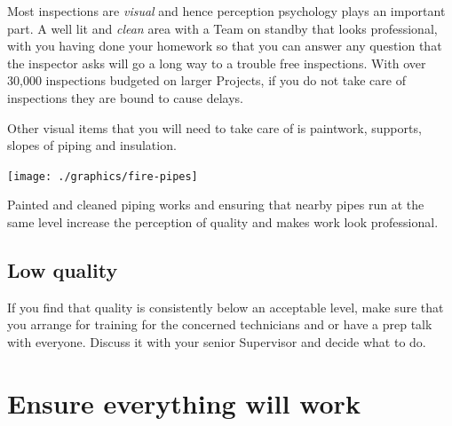 Most inspections are \textit{visual} and hence perception psychology plays
an important part. A well lit and \textit{clean} area  with a Team on standby that looks professional, with you having done your homework so that you can answer any question that the
inspector asks will go a long way to a trouble free inspections. With over
30,000 inspections budgeted on larger Projects, if you do not take care of
inspections they are bound to cause delays. 

Other visual items that you will need to take care of is paintwork, supports,
slopes of piping and insulation. 

\begin{marginfigure}
\texttt{[image: ./graphics/fire-pipes]}
\caption{Painted and cleaned piping works and ensuring that nearby pipes run at the same level increase the perception of quality and makes work look professional.}
\end{marginfigure}


\subsection*{Low quality}
If you find that quality is consistently below an acceptable level, make sure 
that you arrange for training for the concerned technicians and or have a prep
talk with everyone. Discuss it with your senior Supervisor and decide what to do.

\section*{Ensure everything will work}


